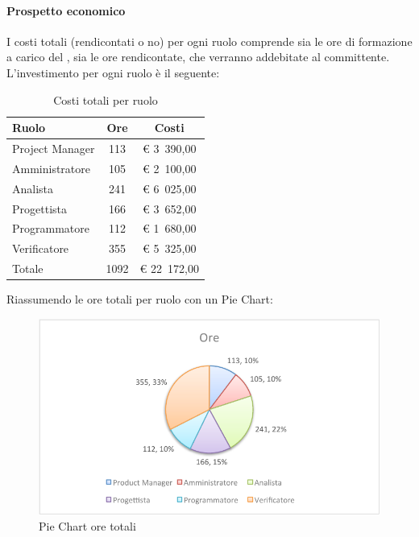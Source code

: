 			\paragraph{Prospetto economico}
				I costi totali (rendicontati o no) per ogni ruolo comprende sia le ore di formazione a carico del \groupname{}, sia le ore rendicontate, che verranno addebitate al committente.\\
				L'investimento per ogni ruolo è il seguente:
				\begin{table}[H]
					\begin{center}
						\begin{tabular}{| l | c | c |}
							\hline
							Ruolo 			& Ore 	& Costi  \\ \hline
							
							Project Manager	& 113 	& \euro{} 3~390,00 	\\
							Amministratore 		& 105 	& \euro{} 2~100,00 	\\
							Analista	 		& 241 	& \euro{} 6~025,00 	\\
							Progettista 		& 166	& \euro{} 3~652,00 	\\
							Programmatore		& 112	& \euro{} 1~680,00	\\
							Verificatore		& 355 	& \euro{} 5~325,00 	\\ \hline \hline
							
							Totale	 		& 1092 	& \euro{} 22~172,00 	\\ \hline
						\end{tabular}
					\end{center}
					\caption{Costi totali per ruolo}
				\end{table}
				Riassumendo le ore totali per ruolo con un Pie Chart:
				\begin{figure}[H]\centering
					\includegraphics[width=\textwidth]{PianoDiProgetto/Pics/ChartTotOre.pdf}
					\caption{Pie Chart ore totali}
				\end{figure}
